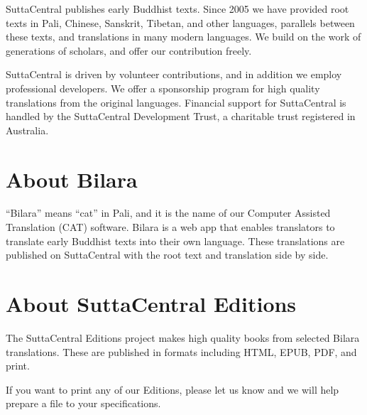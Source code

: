 \documentclass[12pt,openany]{book}%
\begin{document}
SuttaCentral publishes early Buddhist texts. Since 2005 we have provided root texts in Pali, Chinese, Sanskrit, Tibetan, and other languages, parallels between these texts, and translations in many modern languages. We build on the work of generations of scholars, and offer our contribution freely.

SuttaCentral is driven by volunteer contributions, and in addition we employ professional developers. We offer a sponsorship program for high quality translations from the original languages. Financial support for SuttaCentral is handled by the SuttaCentral Development Trust, a charitable trust registered in Australia.

\section*{About Bilara}

“Bilara” means “cat” in Pali, and it is the name of our Computer Assisted Translation (CAT) software. Bilara is a web app that enables translators to translate early Buddhist texts into their own language. These translations are published on SuttaCentral with the root text and translation side by side.

\section*{About SuttaCentral Editions}

The SuttaCentral Editions project makes high quality books from selected Bilara translations. These are published in formats including HTML, EPUB, PDF, and print.

If you want to print any of our Editions, please let us know and we will help prepare a file to your specifications.

%
\end{document}

